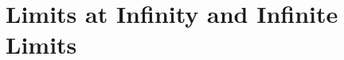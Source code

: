 \documentclass[12pt]{memoir}
\begin{document}
    \section{Limits at Infinity and Infinite Limits}
    
%     
%     
%     
%     
\end{document}
